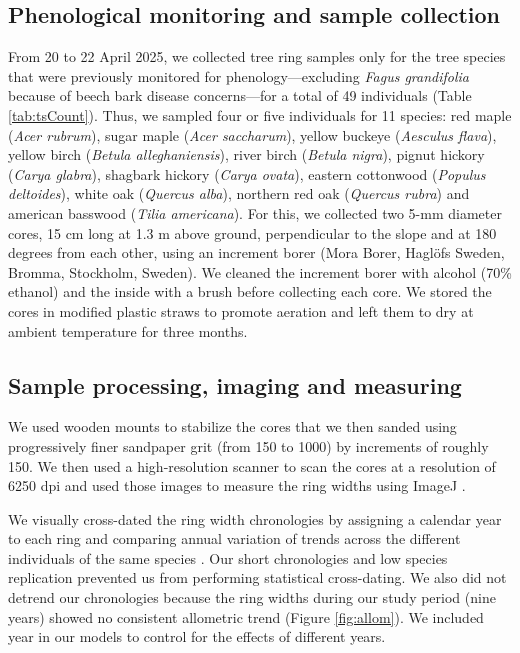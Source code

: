 \subsection{Phenological monitoring and sample collection}
From 20 to 22 April 2025, we collected tree ring samples only for the tree species that were previously monitored for phenology---excluding \textit{Fagus grandifolia} because of beech bark disease concerns---for a total of 49 individuals (Table \ref{tab:tsCount}).  Thus, we sampled four or five individuals for 11 species: red maple (\textit{Acer rubrum}), sugar maple (\textit{Acer saccharum}), yellow buckeye (\textit{Aesculus flava}), yellow birch (\textit{Betula alleghaniensis}), river birch (\textit{Betula nigra}), pignut hickory (\textit{Carya glabra}), shagbark hickory (\textit{Carya ovata}), eastern cottonwood (\textit{Populus deltoides}), white oak (\textit{Quercus alba}), northern red oak (\textit{Quercus rubra}) and american basswood (\textit{Tilia americana}). For this, we collected two 5-mm diameter cores, 15 cm long at 1.3 m above ground, perpendicular to the slope and at 180 degrees from each other, using an increment borer (Mora Borer, Haglöfs Sweden, Bromma, Stockholm, Sweden). We cleaned the increment borer with alcohol (70\% ethanol) and the inside with a brush before collecting each core. We stored the cores in modified plastic straws to promote aeration and left them to dry at ambient temperature for three months.

\subsection{Sample processing, imaging and measuring}
We used wooden mounts to stabilize the cores that we then sanded using progressively finer sandpaper grit (from 150 to 1000) by increments of roughly 150. We then used a high-resolution scanner to scan the cores at a resolution of 6250 dpi \citep{fong_tim_2026} and used those images to measure the ring widths using ImageJ \citep{schneider_nih_2012}. 

We visually cross-dated the ring width chronologies by assigning a calendar year to each ring and comparing annual variation of trends across the different individuals of the same species \citep{cook_methods_1990}. Our short chronologies and low species replication prevented us from performing statistical cross-dating. We also did not detrend our chronologies because the ring widths during our study period (nine years) showed no consistent allometric trend (Figure \ref{fig:allom}). We included year in our models to control for the effects of different years.

